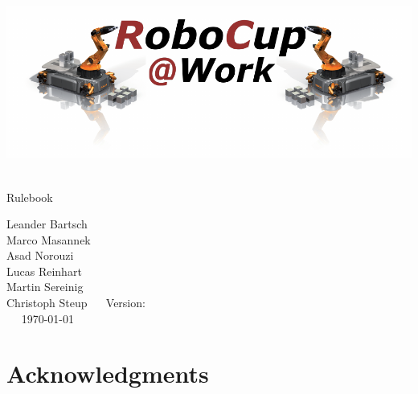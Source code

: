 
\begin{titlepage}
  \begin{center}
    {

      \includegraphics[width=\textwidth]{images/logo_RoboCupAtWork.pdf}\\[1.23ex]
    }
    \vspace{2.7 cm}
    \hrulefill\par
    {%
      \vspace*{.27cm}
      \Huge{\RCAW}\\[1.23ex]
      \Large Rulebook \\[2ex]
    }

    \hrulefill\par

    \vfill
    Leander Bartsch\\
    Marco Masannek\\
    Asad Norouzi\\
    Lucas Reinhart\\
    Martin Sereinig\\
    Christoph Steup
    \vfill
    ~~ Version: \YEAR ~~ \\
    ~~  \today ~~ \\
  \end{center}

\newpage

\section*{Acknowledgments}


\end{titlepage}
